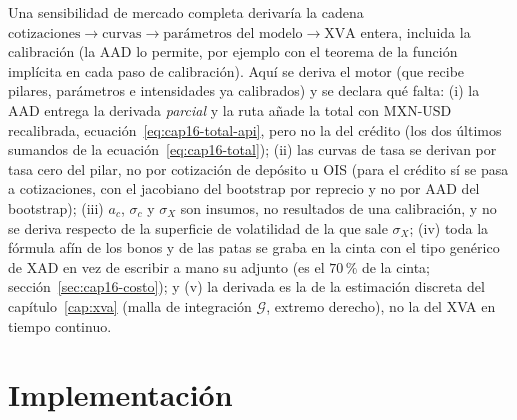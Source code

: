 \begin{sloppypar}
\begin{diferencia}
  Una sensibilidad de mercado completa derivaría la cadena
  $\text{cotizaciones}\to\text{curvas}\to\text{parámetros del modelo}\to\text{XVA}$ entera, incluida la calibración (la
  AAD lo permite, por ejemplo con el teorema de la función implícita en cada paso de calibración). Aquí se deriva el motor (que recibe pilares, parámetros e intensidades ya
  calibrados) y se declara qué falta: (i) la AAD entrega la derivada \emph{parcial} y la ruta añade la total con MXN-USD recalibrada, ecuación~\eqref{eq:cap16-total-api},
pero no la del crédito (los dos últimos sumandos de la ecuación~\eqref{eq:cap16-total}); (ii) las curvas de tasa se
  derivan por tasa cero del pilar, no por cotización de depósito u OIS (para el crédito sí se pasa a cotizaciones, con
  el jacobiano del bootstrap por reprecio y no por AAD del bootstrap); (iii) $a_c$, $\sigma_c$ y $\sigma_X$ son
  insumos, no resultados de una calibración, y no se deriva respecto de la superficie de volatilidad de la que
  sale $\sigma_X$; (iv) toda la fórmula afín de los bonos y de las patas se graba en la cinta con el tipo genérico de
  XAD en vez de escribir a mano su adjunto (es el $70\,\%$ de la cinta; sección~\ref{sec:cap16-costo}); y (v) la
  derivada es la de la estimación discreta del capítulo~\ref{cap:xva} (malla de integración $\mathcal G$, extremo
  derecho), no la del XVA en tiempo continuo.
\end{diferencia}
\end{sloppypar}

\section{Implementación}\label{sec:cap16-implementacion}

